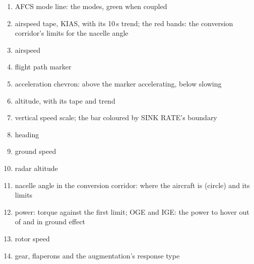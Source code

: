 \begin{enumerate}[label=\textbf{\arabic*},leftmargin=*,itemsep=0pt]
\item AFCS mode line: the modes, green when coupled
\item airspeed tape, KIAS, with its 10\,s trend; the red bands: the conversion corridor's limits for the nacelle angle
\item airspeed
\item flight path marker
\item acceleration chevron: above the marker accelerating, below slowing
\item altitude, with its tape and trend
\item vertical speed scale; the bar coloured by SINK RATE's boundary
\item heading
\item ground speed
\item radar altitude
\item nacelle angle in the conversion corridor: where the aircraft is (circle) and its limits
\item power: torque against the first limit; OGE and IGE: the power to hover out of and in ground effect
\item rotor speed
\item gear, flaperons and the augmentation's response type
\end{enumerate}
